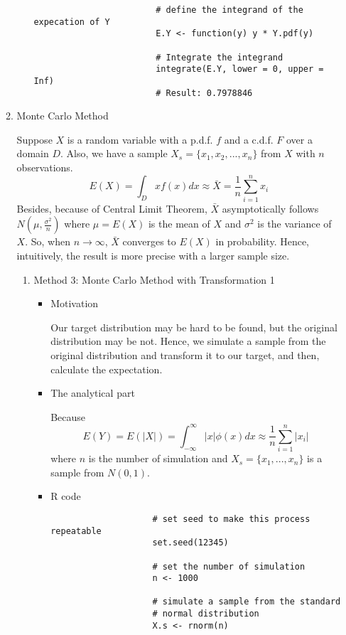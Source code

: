 \begin{enumerate}
\begin{enumerate}
\begin{itemize}
\begin{verbatim}
						# define the integrand of the expecation of Y
						E.Y <- function(y) y * Y.pdf(y)
						
						# Integrate the integrand
						integrate(E.Y, lower = 0, upper = Inf)
						# Result: 0.7978846
					\end{verbatim}
				\end{itemize}
			\item Monte Carlo Method
			\par Suppose $X$ is a random variable with a p.d.f. $f$ and a c.d.f. $F$ over a domain $D$. Also, we have a sample $X_s = \{x_1, x_2, ..., x_n\}$ from $X$ with $n$ observations.
			\begin{equation*}
			E(X) = \int_{D}xf(x)dx \approx \bar{X} = \frac{1}{n} \sum_{i = 1}^{n}x_i
			\end{equation*}
			Besides, because of Central Limit Theorem, $\bar{X}$ asymptotically follows $N(\mu, \frac{\sigma^2}{n})$ where $\mu = E(X)$ is the mean of $X$ and $\sigma^2$ is the variance of $X$. So, when $n \rightarrow \infty$, $\bar{X}$ converges to $E(X)$ in probability. Hence, intuitively, the result is more precise with a larger sample size.
			\begin{enumerate}
				\item Method 3: Monte Carlo Method with Transformation 1
				\begin{itemize}
					\item Motivation
					\par Our target distribution may be hard to be found, but the original distribution may be not. Hence, we simulate a sample from the original distribution and transform it to our target, and then, calculate the expectation.
					\item 
					\par The analytical part
					\par Because 
					\begin{equation*}
					E(Y) = E(|X|) = \int_{-\infty}^{\infty}|x| \phi(x)dx \approx \frac{1}{n}\sum_{i = 1}^{n} |x_i|
					\end{equation*}
					where $n$ is the number of simulation and $X_s = \{ x_1, ..., x_n\}$ is a sample from $N(0, 1)$.
					\item R code
					\begin{verbatim}
					# set seed to make this process repeatable
					set.seed(12345)
					
					# set the number of simulation
					n <- 1000
					
					# simulate a sample from the standard 
					# normal distribution
					X.s <- rnorm(n)
					

\end{verbatim}
\end{itemize}
\end{enumerate}
\end{enumerate}
\end{enumerate}
